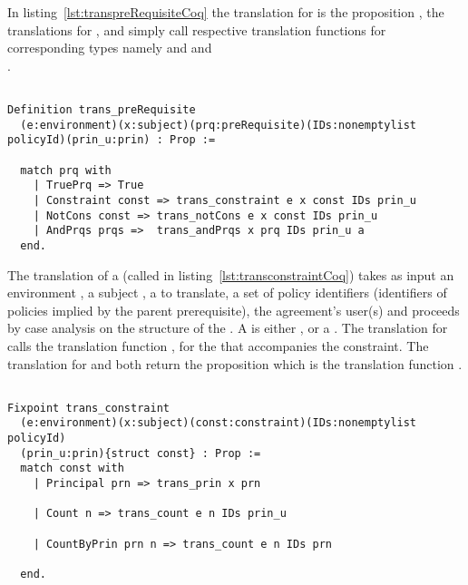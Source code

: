 In listing~\ref{lst:transpreRequisiteCoq} the translation for  is the proposition , the translations for ,  and  simply call respective translation functions for corresponding types namely  and  and \\ . 


\begin{minipage}[c]{0.95\textwidth}
\begin{lstlisting}

Definition trans_preRequisite
  (e:environment)(x:subject)(prq:preRequisite)(IDs:nonemptylist policyId)(prin_u:prin) : Prop := 

  match prq with
    | TruePrq => True
    | Constraint const => trans_constraint e x const IDs prin_u  
    | NotCons const => trans_notCons e x const IDs prin_u 
    | AndPrqs prqs =>  trans_andPrqs x prq IDs prin_u a
  end.
\end{lstlisting}
\end{minipage}

The translation of a  (called  in listing~\ref{lst:transconstraintCoq}) takes as input 
an environment , a subject , a   to translate, a set of policy identifiers  (identifiers of policies implied by the parent prerequisite), the agreement's user(s)  and proceeds by case analysis on the structure of the . A  is either ,  or a . The translation for  calls the translation function , for the  that accompanies the  constraint. The translation for  and  both return the proposition which is the translation function . 


\begin{minipage}[c]{0.95\textwidth}
\begin{lstlisting}

Fixpoint trans_constraint 
  (e:environment)(x:subject)(const:constraint)(IDs:nonemptylist policyId)
  (prin_u:prin){struct const} : Prop := 
  match const with
    | Principal prn => trans_prin x prn
  
    | Count n => trans_count e n IDs prin_u

    | CountByPrin prn n => trans_count e n IDs prn 

  end.
  
\end{lstlisting}
\end{minipage}

